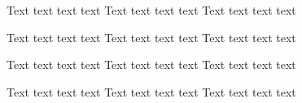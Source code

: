 \documentclass[11pt,a4paper]{book}
\begin{document}
\begin{pages}
\begin{Leftside}
\beginnumbering
\pstart{}\pend

\numberpstarttrue
\pstart Text text text text\pend
\pstart Text text text text\pend
\pstart Text text text text\pend

\numberpstartfalse
\pstart{}\pend

\numberpstarttrue
\setcounter{pstart}{1}
\pstart Text text text text\pend
\pstart Text text text text\pend
\pstart Text text text text\pend
\endnumbering
\end{Leftside}

\begin{Rightside}
\beginnumbering
\pstart{}\pend

\numberpstarttrue
\pstart Text text text text\pend
\pstart Text text text text\pend
\pstart Text text text text\pend

\numberpstartfalse
\pstart{}\pend

\numberpstarttrue
\setcounter{pstart}{1}
\pstart Text text text text\pend
\pstart Text text text text\pend
\pstart Text text text text\pend
\endnumbering
\end{Rightside}
\end{pages}
\Pages
\end{document}
